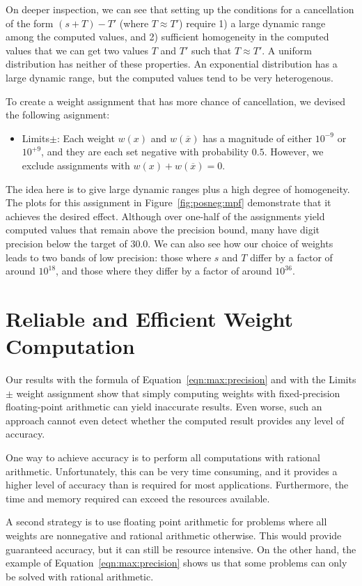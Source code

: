 \documentclass[letterpaper,USenglish,cleveref, autoref, thm-restate]{lipics-v2021}
\newcommand{\obar}[1]{\overline{#1}}
\begin{document}
On deeper inspection, we can see that setting up the conditions for a
cancellation of the form $(s + T) - T'$ (where $T \approx T'$) require
1) a large dynamic range among the computed values, and 2) sufficient
homogeneity in the computed values that we can get two values $T$ and
$T'$ such that $T \approx T'$.  A uniform distribution has neither of
these properties.  An exponential distribution has a large dynamic
range, but the computed values tend to be very heterogenous.

To create a weight assignment that has more chance of cancellation, we devised the following asignment:
\begin{itemize}
\item\textsf{Limits$\pm$}:  Each weight $w(x)$ and $w(\obar{x})$ has a magnitude of either $10^{-9}$ or $10^{+9}$, and they are each set negative with probability $0.5$.
  However, we exclude assignments with $w(x) + w(\obar{x}) = 0$.
\end{itemize}
The idea here is to give large dynamic ranges plus a high degree of
homogeneity.  The plots for this assignment in
Figure~\ref{fig:posneg:mpf} demonstrate that it achieves the desired
effect.  Although over one-half of the assignments yield computed
values that remain above the precision bound, many have digit
precision below the target of $30.0$.  We can also see how our choice
of weights leads to two bands of low precision: those where $s$ and
$T$ differ by a factor of around $10^{18}$, and those where they
differ by a factor of around $10^{36}$.

\section{Reliable and Efficient Weight Computation}

Our results with the formula of Equation~\ref{eqn:max:precision} and
with the \textsf{Limits$\pm$} weight assignment show that simply
computing weights with fixed-precision floating-point arithmetic can
yield inaccurate results.  Even worse, such an approach cannot even
detect whether the computed result provides any level of accuracy.

One way to achieve accuracy is to perform all computations with
rational arithmetic.  Unfortunately, this can be very time consuming,
and it provides a higher level of accuracy than is required for most
applications.  Furthermore, the time and memory required can exceed
the resources available.

A second strategy is to use floating point arithmetic for problems
where all weights are nonnegative and rational arithmetic otherwise.
This would provide guaranteed accuracy, but it can still be resource
intensive.  On the other hand, the example of
Equation~\ref{eqn:max:precision} shows us that some problems can only
be solved with rational arithmetic.
\end{document}
